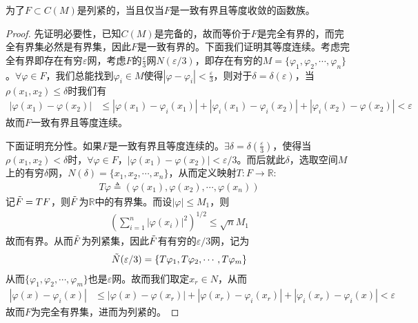 \begin{theorem}
    为了$F\subset C(M)$是列紧的，当且仅当$F$是一致有界且等度收敛的函数族。
\end{theorem}
\begin{proof}
    先证明必要性，已知$C(M)$是完备的，故而等价于$F$是完全有界的，而完全有界集必然是有界集，因此$F$是一致有界的。下面我们证明其等度连续。考虑完全有界即存在有穷$\varepsilon$网，考虑$F$的$\frac{\varepsilon}{3}$网$N(\varepsilon/3)$，即存在有穷的$M = \{\varphi_1,\varphi_2,\cdots,\varphi_n\}$。$\forall \varphi\in F$，我们总能找到$\varphi_i\in M$使得$|\varphi - \varphi_i| < \frac{\varepsilon}{3}$，则对于$\delta = \delta(\varepsilon)$，当$\rho(x_1,x_2)\leqslant \delta$时我们有
    \begin{align*}
        |\varphi(x_1) - \varphi(x_2)| &\leqslant |\varphi(x_1) - \varphi_i(x_1)| + |\varphi_i(x_1) - \varphi_i(x_2)| + | \varphi_i(x_2) - \varphi(x_2)| < \varepsilon
    \end{align*}
    故而$F$一致有界且等度连续。

    下面证明充分性。如果$F$是一致有界且等度连续的。$\exists \delta = \delta(\frac{\varepsilon}{3})$，使得当$\rho(x_1,x_2)<\delta$时，$\forall \varphi\in F$，$|\varphi(x_1) - \varphi(x_2)| < \varepsilon/3$。而后就此$\delta$，选取空间$M$上的有穷$\delta$网，$N(\delta) = \{x_1,x_2,\cdots,x_n\}$，从而定义映射$T:F\to\mathbb{R}$:
    \begin{align*}
        T\varphi \triangleq (\varphi(x_1),\varphi(x_2),\cdots,\varphi(x_n))
    \end{align*}
    记$\Tilde{F} = TF$，则$\Tilde{F}$为$\mathbb{R}$中的有界集。而设$|\varphi|\leqslant M_1$，则
    \begin{align*}
        \left( \sum\limits_{i=1}^n |\varphi(x_i)|^2 \right)^{1/2}\leqslant \sqrt{n}M_1
    \end{align*}
    故而有界。从而$\Tilde{F}$为列紧集，因此$\Tilde{F}$有有穷的$\varepsilon/3$网，记为
    \begin{align*}
        \Tilde{N}(\varepsilon/3) = \{T\varphi_1, T\varphi_2,\cdots,T\varphi_m\}
    \end{align*}
    从而$\{\varphi_1,\varphi_2,\cdots,\varphi_m\}$也是$\varepsilon$网。故而我们取定$x_r\in N$，从而
    \begin{align*}
        |\varphi(x) - \varphi_i(x)| &\leqslant |\varphi(x) - \varphi(x_r)| + |\varphi(x_r) - \varphi_i(x_r)| + |\varphi_i(x_r) - \varphi_i(x)| < \varepsilon
    \end{align*}
    故而$F$为完全有界集，进而为列紧的。
\end{proof}

